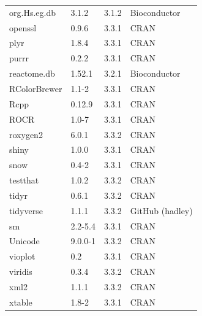 \begin{longtable}{llll}
\rowcolor{black!5}
org.Hs.eg.db & 3.1.2          & 3.1.2 & Bioconductor    \\
\rowcolor{black!10}
openssl      & 0.9.6          & 3.3.1 & \gls{CRAN}            \\
\rowcolor{black!5}
plyr         & 1.8.4          & 3.3.1 & \gls{CRAN}            \\
\rowcolor{black!10}
purrr        & 0.2.2          & 3.3.1 & \gls{CRAN}            \\
\rowcolor{black!5}
reactome.db  & 1.52.1         & 3.2.1 & Bioconductor    \\
\rowcolor{black!10}
RColorBrewer & 1.1-2          & 3.3.1 & \gls{CRAN}            \\
\rowcolor{black!5}
Rcpp         & 0.12.9         & 3.3.1 & \gls{CRAN}            \\
\rowcolor{black!10}
ROCR         & 1.0-7          & 3.3.1 & \gls{CRAN}            \\
\rowcolor{black!5}
roxygen2     & 6.0.1          & 3.3.2 & \gls{CRAN}            \\
\rowcolor{black!10}
shiny        & 1.0.0          & 3.3.1 & \gls{CRAN}            \\
\rowcolor{black!5}
snow         & 0.4-2          & 3.3.1 & \gls{CRAN}            \\
\rowcolor{black!10}
testthat     & 1.0.2          & 3.3.2 & \gls{CRAN}            \\
\rowcolor{black!5}
tidyr        & 0.6.1          & 3.3.2 & \gls{CRAN}            \\
\rowcolor{black!10}
tidyverse    & 1.1.1          & 3.3.2 & GitHub (hadley) \\
\rowcolor{black!5}
sm           & 2.2-5.4        & 3.3.1 & \gls{CRAN}            \\
\rowcolor{black!10}
Unicode      & 9.0.0-1        & 3.3.2 & \gls{CRAN}            \\
\rowcolor{black!5}
vioplot      & 0.2            & 3.3.1 & \gls{CRAN}            \\
\rowcolor{black!10}
viridis      & 0.3.4          & 3.3.2 & \gls{CRAN}            \\
\rowcolor{black!5}
xml2         & 1.1.1          & 3.3.2 & \gls{CRAN}            \\
\rowcolor{black!10}
xtable       & 1.8-2          & 3.3.1 & \gls{CRAN}            \\

\end{longtable}
